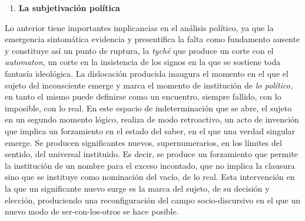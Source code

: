 \documentclass{book}
\begin{document}
\begin{enumerate}
\def\labelenumi{\arabic{enumi}.}
\setcounter{enumi}{5}
\item
  \textbf{La subjetivación política}
\end{enumerate}

Lo anterior tiene importantes implicancias en el análisis político, ya
que la emergencia sintomática evidencia y presentifica la falta como
fundamento ausente y constituye así un punto de ruptura, la \emph{tyché}
que produce un corte con el \emph{automaton}, un corte en la insistencia
de los signos en la que se sostiene toda fantasía ideológica. La
dislocación producida inaugura el momento en el que el sujeto del
inconsciente emerge y marca el momento de institución de \emph{lo
político,} en tanto el mismo puede definirse como un encuentro, siempre
fallido, con lo imposible, con lo real. En este espacio de
indeterminación que se abre, el sujeto en un segundo momento lógico,
realiza de modo retroactivo, un acto de invención que implica un
forzamiento en el estado del saber, en el que una verdad singular
emerge. Se producen significantes nuevos, supernumerarios, en los
límites del sentido, del universal instituido. Es decir, se produce un
forzamiento que permite la institución de un nombre para el exceso
incontado, que no implica la clausura sino que se instituye como
nominación del vacío, de lo real. Esta intervención en la que un
significante nuevo surge es la marca del sujeto, de su decisión y
elección, produciendo una reconfiguración del campo socio-discursivo en
el que un nuevo modo de ser-con-los-otros se hace posible.
\end{document}
